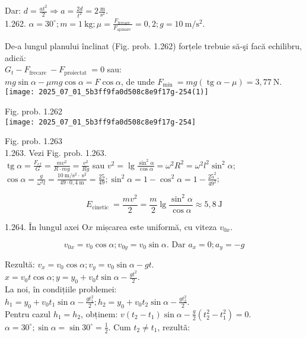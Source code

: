 Dar: $d=\frac{a t^{2}}{2} \Rightarrow a=\frac{2 d}{t^{2}}=2 \frac{\mathrm{~m}}{\mathrm{~s}^{2}}$.\\
1.262. $\alpha=30^{\circ} ; m=1 \mathrm{~kg} ; \mu=\frac{F_{\text {frecare }}}{F_{\text {apăsare }}}=0,2 ; g=10 \mathrm{~m} / \mathrm{s}^{2}$.

De-a lungul planului înclinat (Fig. prob. 1.262) forțele trebuie să-şi facă echilibru, adică:\\
$G_{t}-F_{\text {frecare }}-F_{\text {proiectat }}=0$ sau:\\
$m g \sin \alpha-\mu m g \cos \alpha=F \cos \alpha$, de unde $F_{\text {min }}=m g(\operatorname{tg} \alpha-\mu)=3,77 \mathrm{~N}$.\\
\texttt{[image: 2025\_07\_01\_5b3ff9fa0d508c8e9f17g-254(1)]}

Fig. prob. 1.262\\
\texttt{[image: 2025\_07\_01\_5b3ff9fa0d508c8e9f17g-254]}

Fig. prob. 1.263\\
1.263. Vezi Fig. prob. 1.263.\\
$\operatorname{tg} \alpha=\frac{F_{c f}}{G}=\frac{m v^{2}}{R \cdot m g}=\frac{v^{2}}{R g}$ sau $v^{2}=\lg \frac{\sin ^{2} \alpha}{\cos \alpha}=\omega^{2} R^{2}=\omega^{2} l^{2} \sin ^{2} \alpha ;$\\
$\cos \alpha=\frac{g}{\omega^{2} l}=\frac{10 \mathrm{~m} / \mathrm{s}^{2} \cdot \mathrm{~s}^{2}}{49 \cdot 0,4 \mathrm{~m}}=\frac{25}{49} ; \sin ^{2} \alpha=1-\cos ^{2} \alpha=1-\frac{25^{2}}{49^{2}}$;

$$
E_{\text {cinetic }}=\frac{m v^{2}}{2}=\frac{m}{2} \lg \frac{\sin ^{2} \alpha}{\cos \alpha} \approx 5,8 \mathrm{~J}
$$

1.264. În lungul axei $\mathrm{O} x$ mișcarea este uniformă, cu viteza $v_{0 x}$.

$$
v_{0 x}=v_{0} \cos \alpha ; v_{0 y}=v_{0} \sin \alpha . \text { Dar } a_{x}=0 ; a_{y}=-g
$$

Rezultă: $v_{x}=v_{0} \cos \alpha ; v_{y}=v_{0} \sin \alpha-g t$.\\
$x=v_{0} t \cos \alpha ; y=y_{0}+v_{0} t \sin \alpha-\frac{g t^{2}}{2}$.\\
La noi, în condițiile problemei:\\
$h_{1}=y_{0}+v_{0} t_{1} \sin \alpha-\frac{g t_{1}^{2}}{2} ; h_{2}=y_{0}+v_{0} t_{2} \sin \alpha-\frac{g t_{2}^{2}}{2}$.\\
Pentru cazul $h_{1}=h_{2}$, obținem: $v\left(t_{2}-t_{1}\right) \sin \alpha-\frac{g}{2}\left(t_{2}^{2}-t_{1}^{2}\right)=0$.\\
$\alpha=30^{\circ} ; \sin \alpha=\sin 30^{\circ}=\frac{1}{2}$. Cum $t_{2} \neq t_{1}$, rezultã:

